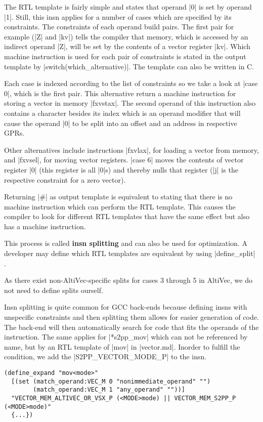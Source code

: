 The RTL template is fairly simple and states that operand |0| is set by operand |1|.
Still, this insn applies for a number of cases which are specified by its constraints.
The constraints of each operand build pairs.
The first pair for example (|Z| and |kv|) tells the compiler that memory, which is accessed by an indirect operand |Z|, will be set by the contents of a vector register |kv|.
Which machine instruction is used for each pair of constraints is stated in the output template by |switch(which_alternative)|.
The template can also be written in C.

Each case is indexed according to the list of constraints so we take a look at |case 0|, which is the first pair.
This alternative return a machine instruction for storing a vector in memory |fxvstax|.
The second operand of this instruction also contains a character besides its index which is an operand modifier \citep{GCCint:asm} that will cause the operand |0| to be split into an offset and an address in respective GPRs.

Other alternatives include instructions |fxvlax|, for loading a vector from memory, and |fxvsel|, for moving vector registers.
|case 6| moves the contents of vector register |0| (this register is all |0|s) and thereby nulls that register (|j| is the respective constraint for a zero vector).

Returning |#| as output template is equivalent to stating that there is no machine instruction which can perform the RTL template.
This causes the compiler to look for different RTL templates that have the same effect but also has a machine instruction.

This process is called \textbf{insn splitting} and can also be used for optimization.
A developer may define which RTL templates are equivalent by using |define_split| \citep{GCCint:definesplit}.

As there exist non-AltiVec-specific splits for cases 3 through 5 in AltiVec, we do not need to define splits ourself.

Insn splitting is quite common for GCC back-ends because defining insns with unspecific constraints and then splitting them allows for easier generation of code.
The back-end will then automatically search for code that fits the operands of the instruction.
The same applies for |*s2pp_mov| which can not be referenced by name, but by an RTL template of |mov| in |vector.md|.
Inorder to fulfill the condition, we add the |S2PP_VECTOR_MODE_P| to the insn.
\begin{lstlisting}
(define_expand "mov<mode>"
  [(set (match_operand:VEC_M 0 "nonimmediate_operand" "")
        (match_operand:VEC_M 1 "any_operand" ""))]
  "VECTOR_MEM_ALTIVEC_OR_VSX_P (<MODE>mode) || VECTOR_MEM_S2PP_P (<MODE>mode)"
  {...})
\end{lstlisting}

